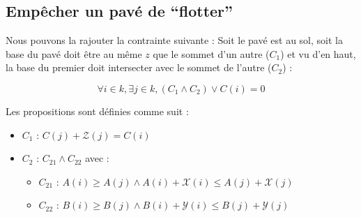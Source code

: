 \documentclass[a4paper]{article}
\begin{document}
\subsection{Empêcher un pavé de ``flotter''}
Nous pouvons la rajouter la contrainte suivante : Soit le pavé est au sol, soit la base du pavé doit être au même $z$ que le sommet d'un autre ($C_1$) et vu d'en haut, la base du premier doit intersecter avec le sommet de l'autre ($C_2$) :

$$\forall i \in k, \exists j \in k, (C_1 \land C_2) \lor C(i) = 0$$

Les propositions sont définies comme suit :
\begin{itemize}
  \item $C_1$ :
  $
  C(j) + \mathcal{Z}(j) = C(i)
  $
  \item $C_2$ : $C_{21} \land C_{22}$ avec :
  \begin{itemize}
    \item $C_21$ : $A(i) \geq A(j) \land A(i) + \mathcal{X}(i) \leq A(j) + \mathcal{X}(j)$
    \item $C_22$ : $B(i) \geq B(j) \land B(i) + \mathcal{Y}(i) \leq B(j) + \mathcal{Y}(j)$
  \end{itemize}
\end{itemize}
\end{document}
